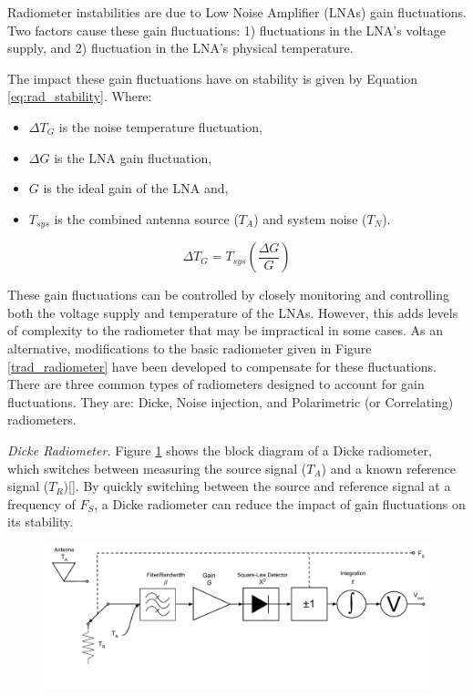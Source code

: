 Radiometer instabilities are due to Low Noise Amplifier (LNAs) gain fluctuations.  Two factors cause these gain fluctuations: 1) fluctuations in the LNA's voltage supply, and 2) fluctuation in the LNA's physical temperature.  

The impact these gain fluctuations have on stability is given by Equation \ref{eq:rad_stability}.  Where:

\begin{itemize}
\item $\Delta T_G$ is the noise temperature fluctuation,
\item $\Delta G$ is the LNA gain fluctuation,
\item $G$ is the ideal gain of the LNA and,
\item $T_{sys}$ is the combined antenna source ($T_A$) and system noise ($T_N$).
\end{itemize}

\begin{equation} \label{eq:rad_stability}
\Delta T_G=T_{sys} \left(\frac{\Delta G}{G}\right)
\end{equation}

These gain fluctuations can be controlled by closely monitoring and controlling both the voltage supply and temperature of the LNAs. However, this adds levels of complexity to the radiometer that may be impractical in some cases.  As an alternative, modifications to the basic radiometer given in Figure \ref{trad_radiometer} have been developed to compensate for these fluctuations.  There are three common types of radiometers designed to account for gain fluctuations.  They are: Dicke, Noise injection, and Polarimetric (or Correlating) radiometers.

\emph{Dicke Radiometer.}  Figure \ref{dicke_radiometer} shows the block diagram of a Dicke radiometer, which switches between measuring the source signal ($T_A$) and a known reference signal ($T_R$)[\cite{Dicke}].  By quickly switching between the source and reference signal at a frequency of $F_S$, a Dicke radiometer can reduce the impact of gain fluctuations on its stability.  

{\begin{figure}[h!tb] 
\centering
\includegraphics[width=\textwidth]{Images/Dicke_Radiometer.pdf}
\label{dicke_radiometer}
\end{figure}
}

